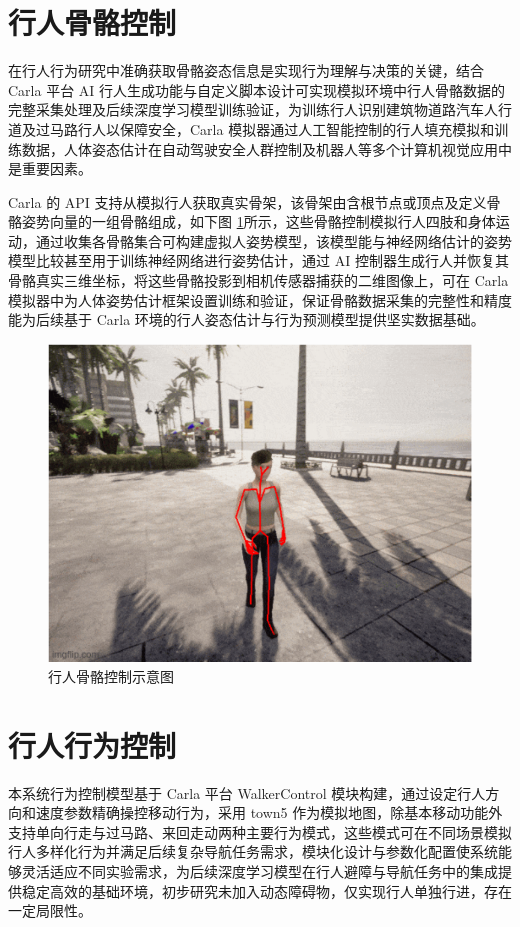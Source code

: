 \section{行人骨骼控制}

在行人行为研究中准确获取骨骼姿态信息是实现行为理解与决策的关键，结合 Carla 平台 AI 行人生成功能与自定义脚本设计可实现模拟环境中行人骨骼数据的完整采集处理及后续深度学习模型训练验证，为训练行人识别建筑物道路汽车人行道及过马路行人以保障安全，Carla 模拟器通过人工智能控制的行人填充模拟和训练数据，人体姿态估计在自动驾驶安全人群控制及机器人等多个计算机视觉应用中是重要因素。

Carla 的 API 支持从模拟行人获取真实骨架，该骨架由含根节点或顶点及定义骨骼姿势向量的一组骨骼组成\cite{openhutb2025}，如下图 \ref{fig:pedestrian_skeleton}所示，这些骨骼控制模拟行人四肢和身体运动，通过收集各骨骼集合可构建虚拟人姿势模型，该模型能与神经网络估计的姿势模型比较甚至用于训练神经网络进行姿势估计，通过 AI 控制器生成行人并恢复其骨骼真实三维坐标，将这些骨骼投影到相机传感器捕获的二维图像上，可在 Carla 模拟器中为人体姿势估计框架设置训练和验证，保证骨骼数据采集的完整性和精度能为后续基于 Carla 环境的行人姿态估计与行为预测模型提供坚实数据基础。

\begin{figure}[H]
    \centering
    \includegraphics[width=1\textwidth]{images/pedestrian_skeleton.pdf}
    \caption{行人骨骼控制示意图}
    \label{fig:pedestrian_skeleton}
\end{figure}

\section{行人行为控制}
本系统行为控制模型基于 Carla 平台 WalkerControl 模块构建，通过设定行人方向和速度参数精确操控移动行为，采用 town5 作为模拟地图，除基本移动功能外支持单向行走与过马路、来回走动两种主要行为模式，这些模式可在不同场景模拟行人多样化行为并满足后续复杂导航任务需求，模块化设计与参数化配置使系统能够灵活适应不同实验需求，为后续深度学习模型在行人避障与导航任务中的集成提供稳定高效的基础环境，初步研究未加入动态障碍物，仅实现行人单独行进，存在一定局限性。\cite{csdn2023carla}

